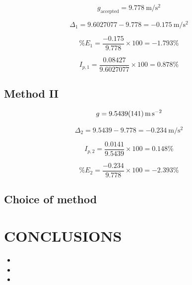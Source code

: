 \documentclass[11pt,a4paper]{article}
\begin{document}
\begin{equation}
g_{\text{accepted}}=\qty{9.778}{\m\per\s\squared}
\end{equation}

\begin{equation}
\Delta_1=9.6027077-9.778=\qty{-0.175}{\m\per\s\squared}
\end{equation}

\begin{equation}
\%E_1
=
\frac{-0.175}{9.778}\times100
=
-1.793\%
\end{equation}

\begin{equation}
I_{p,1}
=
\frac{0.08427}{9.6027077}\times100
=
0.878\%
\end{equation}

\subsection*{Method II}

\begin{equation}
g=\qty{9.5439 \pm 0.0141}{\m\per\s\squared}
\end{equation}

\begin{equation}
\Delta_2=9.5439-9.778=\qty{-0.234}{\m\per\s\squared}
\end{equation}

\begin{equation}
I_{p,2}
=
\frac{0.0141}{9.5439}\times100
=
0.148\%
\end{equation}

\begin{equation}
\%E_2
=
\frac{-0.234}{9.778}\times100
=
-2.393\%
\end{equation}

\subsection{Choice of method}

\section{CONCLUSIONS}

\begin{itemize}
  \item
  \item
  \item
\end{itemize}

{}
\nocite{*}


\end{document}
